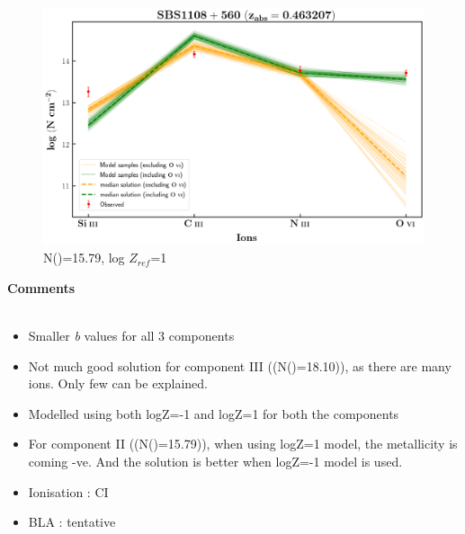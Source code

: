 \documentclass[12pt]{report}
\newcommand\ion[2]{\text{#1\,\textsc{\lowercase{#2}}}}
\begin{document}
\begin{figure}[!b]
    \centering
    \includegraphics[width=0.85\linewidth]{Ionisation-Modelling-Plots/sbs1108-z=0.463207-compII_logZ=1.png}
    \caption{N(\ion{H}{i})=15.79, log $Z_{ref}$=1}
\end{figure}


\newpage

\textbf{Comments}
\\\\
\begin{itemize}
    \item Smaller \emph{b} values for all 3 components
    \item Not much good solution for component III ((N(\ion{H}{i})=18.10)), as there are many ions. Only few can be explained.
    \item Modelled using both logZ=-1 and logZ=1 for both the components
    \item For component II ((N(\ion{H}{i})=15.79)), when using logZ=1 model, the metallicity is coming -ve. And the solution is better when logZ=-1 model is used.
    \item Ionisation : CI
    \item BLA : tentative
\end{itemize}



\newpage
\end{document}
